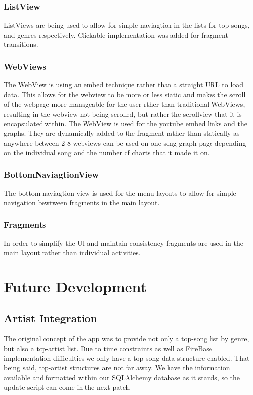 \documentclass{article}
\begin{document}
\subsubsection*{ListView}
ListViews are being used to allow for simple naviagtion in the lists for top-songs, and genres respectively. Clickable implementation was added for fragment transitions.

\subsubsection*{WebViews}
The WebView is using an embed technique rather than a straight URL to load data. 
This allows for the webview to be more or less static and makes the scroll of the webpage more manageable for the user rther than traditional WebViews,
resulting in the webview not being scrolled, but rather the scrollview that it is encapsulated within.
The WebView is used for the youtube embed links and the graphs. 
They are dynamically added to the fragment rather than statically as anywhere between 2-8 webviews can be used on one song-graph page depending on the individual
song and the number of charts that it made it on. 
\subsubsection*{BottomNaviagtionView}
The bottom naviagtion view is used for the menu layouts to allow for simple navigation bewtween fragments in the main layout.
\subsubsection*{Fragments}
In order to simplify the UI and maintain consistency fragments are used in the main layout rather than individual activities. 

\section*{Future Development}
\subsection*{Artist Integration}
The original concept of the app was to provide not only a top-song list by genre, but also a top-artist list. Due to time constraints as well as FireBase implementation difficulties we only have a top-song data structure enabled. That being said, top-artist structures are not far away. We have the information available and formatted within our SQLAlchemy database as it stands, so the update script can come in the next patch.
\end{document}
